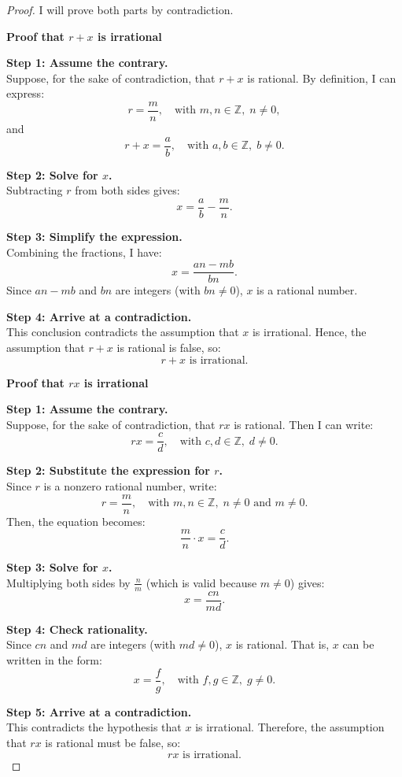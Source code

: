 \documentclass[12pt,oneside]{article}
\theoremstyle{definition}
\begin{document}
\begin{proof}
I will prove both parts by contradiction.

\medskip

\noindent\textbf{Proof that \( r + x \) is irrational}

\textbf{Step 1: Assume the contrary.}\\
Suppose, for the sake of contradiction, that \( r + x \) is rational. By definition, I can express:
\[
r = \frac{m}{n}, \quad \text{with } m, n \in \mathbb{Z}, \; n \neq 0,
\]
and
\[
r + x = \frac{a}{b}, \quad \text{with } a, b \in \mathbb{Z}, \; b \neq 0.
\]

\textbf{Step 2: Solve for \( x \).}\\
Subtracting \( r \) from both sides gives:
\[
x = \frac{a}{b} - \frac{m}{n}.
\]

\textbf{Step 3: Simplify the expression.}\\
Combining the fractions, I have:
\[
x = \frac{a n - m b}{b n}.
\]
Since \( a n - m b \) and \( b n \) are integers (with \( b n \neq 0 \)), \( x \) is a rational number.

\textbf{Step 4: Arrive at a contradiction.}\\
This conclusion contradicts the assumption that \( x \) is irrational. Hence, the assumption that \( r + x \) is rational is false, so:
\[
r + x \text{ is irrational.}
\]

\medskip

\noindent\textbf{Proof that \( r x \) is irrational}

\textbf{Step 1: Assume the contrary.}\\
Suppose, for the sake of contradiction, that \( r x \) is rational. Then I can write:
\[
r x = \frac{c}{d}, \quad \text{with } c, d \in \mathbb{Z}, \; d \neq 0.
\]

\textbf{Step 2: Substitute the expression for \( r \).}\\
Since \( r \) is a nonzero rational number, write:
\[
r = \frac{m}{n}, \quad \text{with } m, n \in \mathbb{Z}, \; n \neq 0 \text{ and } m \neq 0.
\]
Then, the equation becomes:
\[
\frac{m}{n} \cdot x = \frac{c}{d}.
\]

\textbf{Step 3: Solve for \( x \).}\\
Multiplying both sides by \( \frac{n}{m} \) (which is valid because \( m \neq 0 \)) gives:
\[
x = \frac{c n}{m d}.
\]

\textbf{Step 4: Check rationality.}\\
Since \( c n \) and \( m d \) are integers (with \( m d \neq 0 \)), \( x \) is rational. That is, \( x \) can be written in the form:
\[
x = \frac{f}{g}, \quad \text{with } f, g \in \mathbb{Z}, \; g \neq 0.
\]

\textbf{Step 5: Arrive at a contradiction.}\\
This contradicts the hypothesis that \( x \) is irrational. Therefore, the assumption that \( r x \) is rational must be false, so:
\[
r x \text{ is irrational.}
\]
\end{proof}
\end{document}
